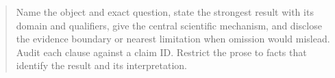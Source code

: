 \begin{abstract}
Name the object and exact question, state the strongest result with its domain
and qualifiers, give the central scientific mechanism, and disclose the
evidence boundary or nearest limitation when omission would mislead. Audit each
clause against a claim ID. Restrict the prose to facts that identify the result
and its interpretation.
\end{abstract}
